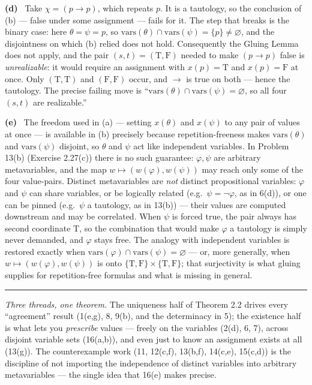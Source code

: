\documentclass[11pt]{article}
\newcommand{\T}{\mathrm{T}}
\newcommand{\F}{\mathrm{F}}
\newcommand{\TF}{\{\T,\F\}}
\newcommand{\vars}{\mathrm{vars}}
\newcommand{\solpart}[1]{\smallskip\noindent\textbf{(#1)}\ }
\begin{document}
\solpart{d} Take $\chi=(p\to p)$, which repeats $p$. It is a tautology, so the
conclusion of (b) --- false under some assignment --- fails for it. The step that
breaks is the binary case: here $\theta=\psi=p$, so $\vars(\theta)\cap\vars(\psi)=
\{p\}\neq\varnothing$, and the disjointness on which (b) relied does not hold.
Consequently the Gluing Lemma does not apply, and the pair $(s,t)=(\T,\F)$ needed
to make $(p\to p)$ false is \emph{unrealizable}: it would require an assignment with
$x(p)=\T$ and $x(p)=\F$ at once. Only $(\T,\T)$ and $(\F,\F)$ occur, and $\to$ is
true on both --- hence the tautology. The precise failing move is ``$\vars(\theta)
\cap\vars(\psi)=\varnothing$, so all four $(s,t)$ are realizable.''

\solpart{e} The freedom used in (a) --- setting $x(\theta)$ and $x(\psi)$ to any
pair of values at once --- is available in (b) precisely because
repetition-freeness makes $\vars(\theta)$ and $\vars(\psi)$ disjoint, so $\theta$
and $\psi$ act like independent variables. In Problem 13(b) (Exercise 2.27(c))
there is no such guarantee: $\varphi,\psi$ are arbitrary metavariables, and the map
$w\mapsto(w(\varphi),w(\psi))$ may reach only some of the four value-pairs. Distinct
metavariables are \emph{not} distinct propositional variables: $\varphi$ and $\psi$
can share variables, or be logically related (e.g.\ $\psi=\lnot\varphi$, as in
6(d)), or one can be pinned (e.g.\ $\psi$ a tautology, as in 13(b)) --- their values
are computed downstream and may be correlated. When $\psi$ is forced true, the pair
always has second coordinate $\T$, so the combination that would make $\varphi$ a
tautology is simply never demanded, and $\varphi$ stays free. The analogy with
independent variables is restored exactly when $\vars(\varphi)\cap\vars(\psi)=
\varnothing$ --- or, more generally, when $w\mapsto(w(\varphi),w(\psi))$ is onto
$\TF\times\TF$; that surjectivity is what gluing supplies for repetition-free
formulas and what is missing in general.

\bigskip
\hrule
\smallskip
\noindent\emph{Three threads, one theorem.} The uniqueness half of Theorem 2.2
drives every ``agreement'' result (1(e,g), 8, 9(b), and the determinacy in 5); the
existence half is what lets you \emph{prescribe} values --- freely on the variables
(2(d), 6, 7), across disjoint variable sets (16(a,b)), and even just to know an
assignment exists at all (13(g)). The counterexample work (11, 12(c,f), 13(b,f),
14(c,e), 15(c,d)) is the discipline of not importing the independence of distinct
variables into arbitrary metavariables --- the single idea that 16(e) makes precise.
\end{document}
